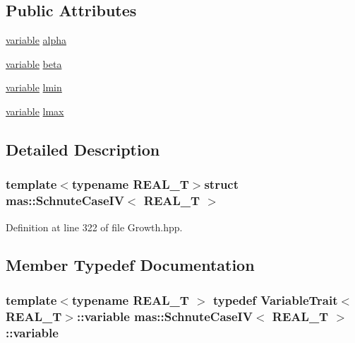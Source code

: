 \subsection*{Public Attributes}
\begin{DoxyCompactItemize}
\item 
\hyperlink{structmas_1_1_schnute_case_i_v_a80605d34c604eedf01a096cefbd776a5}{variable} \hyperlink{structmas_1_1_schnute_case_i_v_a1ff44a6bb870b3ba1d553b5a4d17bd39}{alpha}
\item 
\hyperlink{structmas_1_1_schnute_case_i_v_a80605d34c604eedf01a096cefbd776a5}{variable} \hyperlink{structmas_1_1_schnute_case_i_v_a11a7d5e338909eca6126bd1384a5b0b5}{beta}
\item 
\hyperlink{structmas_1_1_schnute_case_i_v_a80605d34c604eedf01a096cefbd776a5}{variable} \hyperlink{structmas_1_1_schnute_case_i_v_a7b4d5a4e32071d80cd213ca5191bd7b1}{lmin}
\item 
\hyperlink{structmas_1_1_schnute_case_i_v_a80605d34c604eedf01a096cefbd776a5}{variable} \hyperlink{structmas_1_1_schnute_case_i_v_afadfbcde5becffb86f6049bbd59ef09c}{lmax}
\end{DoxyCompactItemize}


\subsection{Detailed Description}
\subsubsection*{template$<$typename R\-E\-A\-L\-\_\-\-T$>$struct mas\-::\-Schnute\-Case\-I\-V$<$ R\-E\-A\-L\-\_\-\-T $>$}



Definition at line 322 of file Growth.\-hpp.



\subsection{Member Typedef Documentation}
\hypertarget{structmas_1_1_schnute_case_i_v_a80605d34c604eedf01a096cefbd776a5}{
\subsubsection[{variable}]{\setlength{\rightskip}{0pt plus 5cm}template$<$typename R\-E\-A\-L\-\_\-\-T $>$ typedef {\bf Variable\-Trait}$<$R\-E\-A\-L\-\_\-\-T$>$\-::{\bf variable} {\bf mas\-::\-Schnute\-Case\-I\-V}$<$ R\-E\-A\-L\-\_\-\-T $>$\-::{\bf variable}}}\label{structmas_1_1_schnute_case_i_v_a80605d34c604eedf01a096cefbd776a5}


